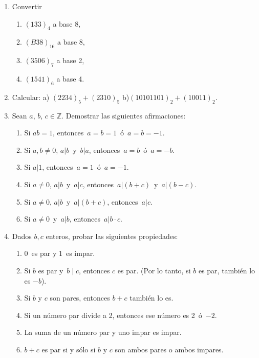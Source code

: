\documentclass[12pt,spanish,makeidx]{amsbook}
\begin{document}
\begin{enumerate}
\smallskip

\item Convertir
\begin{multicols}{2}
\begin{enumerate}
	\item  $(133)_4$ a base 8,
	\item  $(B38)_{16}$ a base 8,
	\item  $(3506)_7$ a base 2,
	\item  $(1541)_6$ a base 4.
\end{enumerate}
\end{multicols}

\smallskip

\item Calcular: a) $(2234)_5+(2310)_5$ \qquad \qquad b)$(10101101)_2+(10011)_2$.

\smallskip

\item Sean $a$, $b$, $c \in {\mathbb Z}$. Demostrar las siguientes afirmaciones:
  \begin{enumerate}
  \item Si $ab=1$, entonces \,$a=b=1$\, ó \,$a=b=-1$.
  \item Si $a,b \neq 0$,  $a| b$\, y \,$b | a$, entonces \,$a=b$\, ó \,$a=-b$.
  \item Si $a | 1$, entonces \,$a=1$\, ó \,$a=-1$.
  \item Si $a \neq 0$, $a | b$\, y \,$a | c$, entonces \,$a | (b+c)$\, y \,$a | (b-c)$.
  \item Si $a \neq 0$, $a | b$\, y \,$a | (b+c)$, entonces \,$a | c$.
  \item Si $a \neq 0$\, y \,$a | b$, entonces \,$a| b\cdot c$.
  \end{enumerate}

\smallskip

\item Dados $b,c$ enteros, probar las siguientes propiedades:
  \begin{enumerate}
  \item  $0$\, es par y $1$\, es impar.
  \item  Si $b$ es par y \,$b \mid c$, entonces $c$ es par.  (Por lo tanto, si $b$ es par, también lo es $-b$).
  \item  Si $b$ y $c$ son pares, entonces $b+c$ también lo es. %
  \item  Si un número par divide a 2, entonces ese número es 2\, ó \,$-2$.
  \item  La suma de un número par y uno impar es impar.
  \item $b + c$ es par si y  sólo si $b$ y $c$ son ambos pares o ambos impares.
\end{enumerate}


\end{enumerate}
\end{document}
